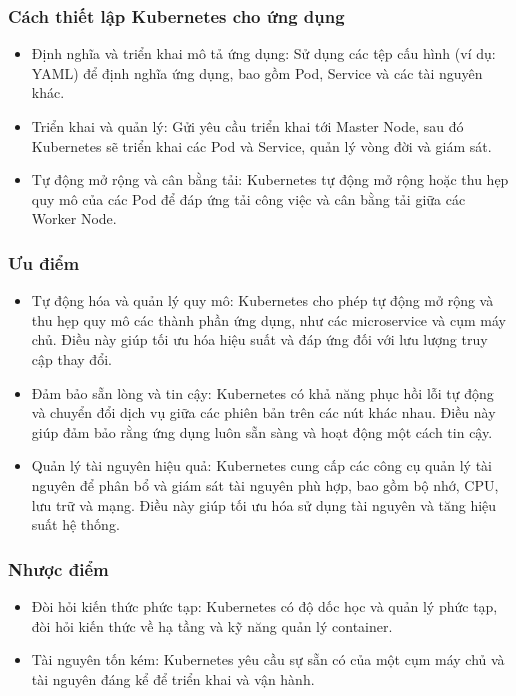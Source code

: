 \subsubsection{Cách thiết lập Kubernetes cho ứng dụng}
\begin{itemize}
    \item Định nghĩa và triển khai mô tả ứng dụng: Sử dụng các tệp cấu hình (ví dụ: YAML) để định nghĩa ứng dụng, bao gồm Pod, Service và các tài nguyên khác.
    \item Triển khai và quản lý: Gửi yêu cầu triển khai tới Master Node, sau đó Kubernetes sẽ triển khai các Pod và Service, quản lý vòng đời và giám sát.
    \item Tự động mở rộng và cân bằng tải: Kubernetes tự động mở rộng hoặc thu hẹp quy mô của các Pod để đáp ứng tải công việc và cân bằng tải giữa các Worker Node.
\end{itemize}
\subsubsection{Ưu điểm}
\begin{itemize}
    \item Tự động hóa và quản lý quy mô: Kubernetes cho phép tự động mở rộng và thu hẹp quy mô các thành phần ứng dụng, như các microservice và cụm máy chủ. Điều này giúp tối ưu hóa hiệu suất và đáp ứng đối với lưu lượng truy cập thay đổi.

    \item Đảm bảo sẵn lòng và tin cậy: Kubernetes có khả năng phục hồi lỗi tự động và chuyển đổi dịch vụ giữa các phiên bản trên các nút khác nhau. Điều này giúp đảm bảo rằng ứng dụng luôn sẵn sàng và hoạt động một cách tin cậy.

    \item Quản lý tài nguyên hiệu quả: Kubernetes cung cấp các công cụ quản lý tài nguyên để phân bổ và giám sát tài nguyên phù hợp, bao gồm bộ nhớ, CPU, lưu trữ và mạng. Điều này giúp tối ưu hóa sử dụng tài nguyên và tăng hiệu suất hệ thống.

\end{itemize}
\subsubsection{Nhược điểm}
\begin{itemize}
    \item Đòi hỏi kiến thức phức tạp: Kubernetes có độ dốc học và quản lý phức tạp, đòi hỏi kiến thức về hạ tầng và kỹ năng quản lý container.
    \item Tài nguyên tốn kém: Kubernetes yêu cầu sự sẵn có của một cụm máy chủ và tài nguyên đáng kể để triển khai và vận hành.
\end{itemize}

